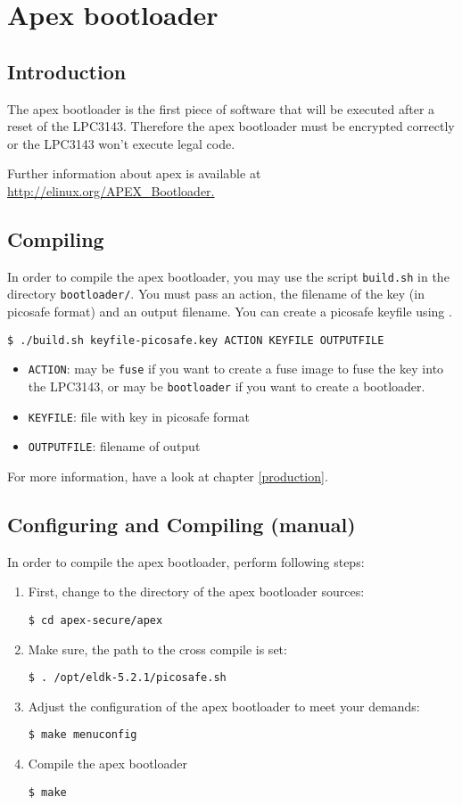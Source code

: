 \chapter{Apex bootloader}

\section{Introduction}

The apex bootloader is the first piece of software that will be executed after
a reset of the LPC3143. Therefore the apex bootloader must be encrypted correctly
or the LPC3143 won't execute legal code.

Further information about apex is available at \url{http://elinux.org/APEX_Bootloader.}

\section{Compiling}

In order to compile the apex bootloader, you may use the script
\texttt{build.sh} in the directory \texttt{bootloader/}. You must pass an
action, the filename of the key (in picosafe format) and an output filename.
You can create a picosafe keyfile using .

\texttt{\$ ./build.sh keyfile-picosafe.key ACTION KEYFILE OUTPUTFILE}

\begin{itemize}
\item \texttt{ACTION}: may be \texttt{fuse} if you want to create a fuse image to fuse the key into the LPC3143, or may be \texttt{bootloader} if you want to create a bootloader.
\item \texttt{KEYFILE}: file with key in picosafe format
\item \texttt{OUTPUTFILE}: filename of output
\end{itemize}

For more information, have a look at chapter \ref{production}.

\section{Configuring and Compiling (manual)}

In order to compile the apex bootloader, perform following steps:

\begin{enumerate}
\item First, change to the directory of the apex bootloader sources:

\texttt{\$ cd apex-secure/apex}
\item Make sure, the path to the cross compile is set:

\texttt{\$ . /opt/eldk-5.2.1/picosafe.sh}
\item Adjust the configuration of the apex bootloader to meet your demands:

\texttt{\$ make menuconfig}
\item Compile the apex bootloader

\texttt{\$ make}
\end{enumerate}

